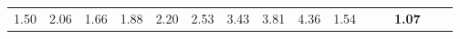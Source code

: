 \begin{tabular}{ll|rrrrrrrrr|rrrr}
  


  
  1.50 & 2.06 & 1.66 & 1.88 & 2.20 & 2.53 & 3.43 & 3.81 & 4.36 & 1.54 &  &  & \textbf{1.07} \\


\end{tabular}
